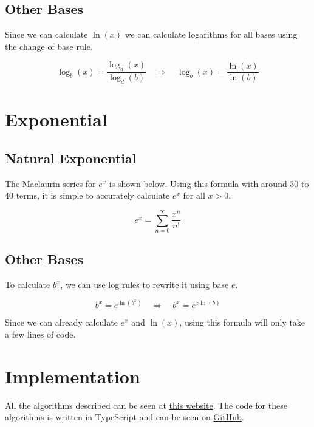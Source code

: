 \documentclass[12pt, letterpaper]{article}
\begin{document}

\subsection{Other Bases}
Since we can calculate $\ln(x)$ we can calculate logarithms for all bases using the change of base rule.

\[ \log_b(x) = \frac{\log_d(x)}{\log_d(b)} \quad \Rightarrow \quad \log_b(x) = \frac{\ln(x)}{\ln(b)} \]

\section{Exponential}
\subsection{Natural Exponential}
The Maclaurin series for $e^x$ is shown below. Using this formula with around 30 to 40 terms, it is simple to accurately calculate $e^x$ for all $x>0$.

\[ e^x = \sum_{n=0}^{\infty}\frac{x^n}{n!} \]

\subsection{Other Bases}

To calculate $b^x$, we can use log rules to rewrite it using base $e$.

\[ b^x = e^{\ln(b^x)} \quad \Rightarrow \quad b^x = e^{x\ln(b)} \]

Since we can already calculate $e^x$ and $\ln(x)$, using this formula will only take a few lines of code.

\section{Implementation}

All the algorithms described can be seen at \href{http://cherry.thomasdev.xyz}{this website}. The code for these algorithms is written in TypeScript and can be seen on \href{https://github.com/mthomas24/cherry-calculator/blob/main/src/calculations.ts}{GitHub}.
\end{document}
